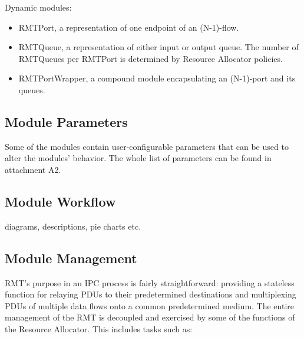             Dynamic modules:
            \begin{itemize}
                \item RMTPort, a representation of one endpoint of an (N-1)-flow.
                \item RMTQueue, a representation of either input or output queue. The number of RMTQueues per RMTPort is determined by Resource Allocator policies.
                \item RMTPortWrapper, a compound module encapsulating an (N-1)-port and its queues.
            \end{itemize}

        \subsection{Module Parameters}
            Some of the modules contain user-configurable parameters that can be used to alter the modules' behavior. The whole list of parameters can be found in attachment A2.

        \subsection{Module Workflow}
            diagrams, descriptions, pie charts etc.

        \subsection{Module Management}
            RMT's purpose in an IPC process is fairly straightforward: providing a stateless function for relaying PDUs to their predetermined destinations and multiplexing PDUs of multiple data flows onto a common predetermined medium. The entire management of the RMT is decoupled and exercised by some of the functions of the Resource Allocator. This includes tasks such as:

